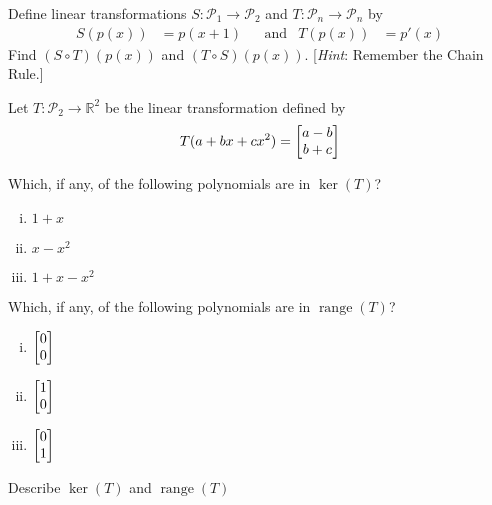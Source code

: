 \documentclass[boxes]{gsypset}
\DeclareMathOperator{\range}{range}
\begin{document}
	\begin{problem}[6.4.27]
		Define linear transformations $S: \mathscr{P}_1 \to \mathscr{P}_2$ and
		$T: \mathscr{P}_n \to \mathscr{P}_n$ by
		\begin{align*}
			S(p(x)) &= p(x+1) &
			&\text{and}&
			T(p(x)) &= p'(x)
		\end{align*}
		Find $(S \circ T)(p(x))$ and $(T \circ S)(p(x))$.
		[\textit{Hint}: Remember the Chain Rule.]
	\end{problem}
	\begin{solution}
		
	\end{solution}
	
	\begin{problem}[6.5.3]
		Let $T: \mathscr{P}_2 \to \mathbb{R}^2$ be the linear transformation defined by
		\[
			T(a + bx + cx^2) = \begin{bmatrix}a-b\\b+c\end{bmatrix}
		\]
		\begin{subproblems}[(a)]
			\subproblem Which, if any, of the following polynomials are in $\ker(T)$?
				\begin{solution}
					\begin{enumerate}[(i)]
						\item $1+x$
						\item $x-x^2$
						\item $1+x-x^2$
					\end{enumerate}
				\end{solution}
			\subproblem Which, if any, of the following polynomials are in $\range(T)$?
				\begin{solution}
					\begin{enumerate}[(i)]
						\item $\begin{bmatrix}0\\0\end{bmatrix}$
						\item $\begin{bmatrix}1\\0\end{bmatrix}$
						\item $\begin{bmatrix}0\\1\end{bmatrix}$
					\end{enumerate}
				\end{solution}
			\subproblem Describe $\ker(T)$ and $\range(T)$
			\begin{solution}
				
			\end{solution}
		\end{subproblems}
	\end{problem}
	\begin{solution}
		
	\end{solution}
	
\end{document}
